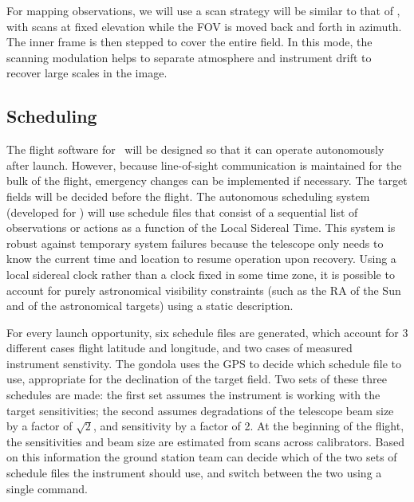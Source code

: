 For mapping observations, we will use a scan strategy will be similar to that of \blast, with scans at fixed elevation while the FOV is moved back and forth in
azimuth.  The inner frame is then stepped to cover the entire field.
In this mode, the scanning modulation helps to separate atmosphere and instrument drift to recover large scales in the image.

\subsection{Scheduling}

The flight software for \name\ will be designed so that it can operate
autonomously after launch.  However, because line-of-sight communication is maintained for the bulk of the flight, emergency changes can be implemented if necessary. The target fields
will be decided before the flight.  The autonomous scheduling system
(developed for \blast) will use schedule files that consist of a
sequential list of observations or actions as a function of the Local
Sidereal Time.  This system is robust against temporary system
failures because the telescope only needs to know the current time and
location to resume operation upon recovery.  Using a local sidereal
clock rather than a clock fixed in some time zone, it is possible to
account for purely astronomical visibility constraints (such as the RA
of the Sun and of the astronomical targets) using a static
description.

For every launch opportunity, six schedule files are generated, which account for 3 different cases flight latitude and longitude, and two cases of measured instrument senstivity.
The gondola uses the GPS to decide which schedule file to use,
appropriate for the declination of the target field.  Two sets of
these three schedules are made: the first set assumes the instrument
is working with the target sensitivities; the second assumes
degradations of the telescope beam size by a factor of $\sqrt{2}$, and
sensitivity by a factor of 2.  At the beginning of the flight, the
sensitivities and beam size are estimated from scans across calibrators.  Based on this information the ground station team can decide which of the two
sets of schedule files the instrument should use, and switch between
the two using a single command.

